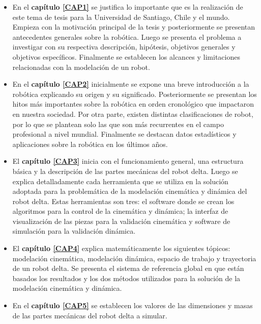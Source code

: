 \begin{itemize}

    \item {En el \textbf{capítulo \eqref{CAP1}} se justifica lo importante que es la realización de este tema de tesis para la Universidad de Santiago, Chile y el mundo. Empieza con la motivación principal de la tesis y posteriormente se presentan antecedentes generales sobre la robótica. Luego se presenta el problema a investigar con su respectiva descripción, hipótesis, objetivos generales y  objetivos específicos. Finalmente se establecen los alcances y limitaciones relacionadas con la modelación de un robot.}
    \item {En el \textbf{capítulo \eqref{CAP2}} inicialmente se expone una breve introducción a la robótica explicando su origen y su significado. Posteriormente se presentan los hitos más importantes sobre la robótica en orden cronológico que impactaron en nuestra sociedad. Por otra parte, existen distintas clasificaciones de robot, por lo que se plantean solo las que son más recurrentes en el campo profesional a nivel mundial. Finalmente se destacan datos estadísticos y aplicaciones sobre la robótica en los últimos años.}
    \item {El \textbf{capítulo \eqref{CAP3}} inicia con el funcionamiento general, una estructura básica y la descripción de las partes mecánicas del robot delta. Luego se explica detalladamente cada herramienta que se utiliza en la solución adoptada para la problemática de la modelación cinemática y dinámica del robot delta. Estas herramientas son tres: el software donde se crean los algoritmos para la control de la cinemática y dinámica; la interfaz de visualización de las piezas para la validación cinemática y software de simulación para la validación dinámica.}
    \item {El \textbf{capítulo \eqref{CAP4}} explica matemáticamente los siguientes tópicos: modelación cinemática, modelación dinámica, espacio de trabajo y trayectoria de un robot delta. Se presenta el sistema de referencia global en que están basados los resultados y los dos métodos utilizados para la solución de la modelación cinemática y dinámica.}
    \item {En el \textbf{capítulo \eqref{CAP5}} se establecen los valores de las dimensiones y masas de las partes mecánicas del robot delta a simular.}

\end{itemize}
